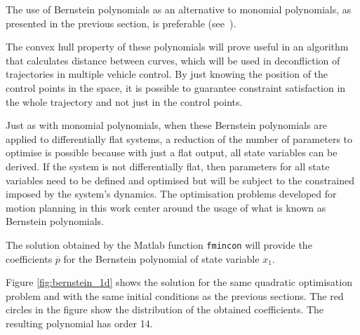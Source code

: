 

\par The use of Bernstein polynomials as an alternative to monomial polynomials, as presented in the previous section, is preferable (see~\cite{cichella2018bernstein}). 

The convex hull property of these polynomials will prove useful in an algorithm that calculates distance between curves, which will be used in deconfliction of trajectories in multiple vehicle control. By just knowing the position of the control points in the space, it is possible to guarantee constraint satisfaction in the whole trajectory and not just in the control points.

\par Just as with monomial polynomials, when these Bernstein polynomials are applied to differentially flat systems, a reduction of the number of parameters to optimise is possible because with just a flat output, all state variables can be derived. If the system is not differentially flat, then parameters for all state variables need to be defined and optimised but will be subject to the constrained imposed by the system's dynamics.
The optimisation problems developed for motion planning in this work center around the usage of what is known as Bernstein polynomials.

\par The solution obtained by the Matlab function \texttt{fmincon} will provide the coefficients $\overline{p}$ for the Bernstein polynomial of state variable $x_1$. 

\par Figure \ref{fig:bernstein_1d} shows the solution for the same quadratic optimisation problem and with the same initial conditions as the previous sections. The red circles in the figure show the distribution of the obtained coefficients. The resulting polynomial has order 14.

